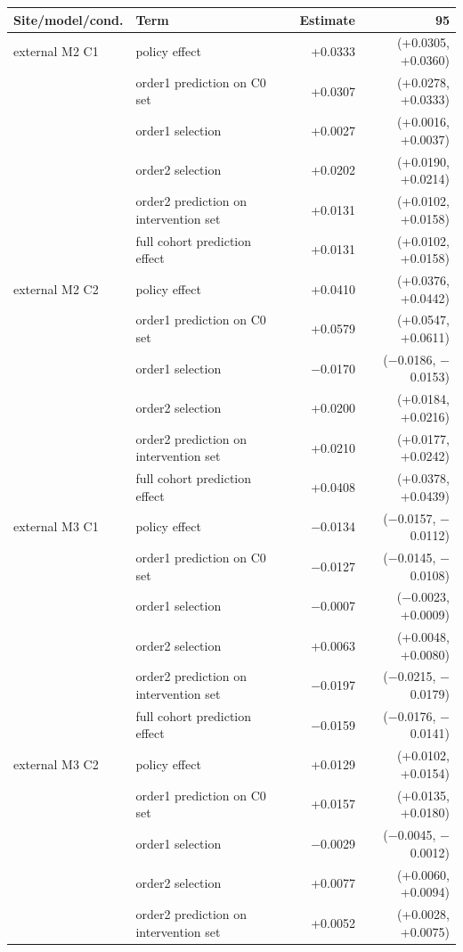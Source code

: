 \begin{longtable}{lllrr}
\toprule
Site/model/cond. & Term & & Estimate & 95\\%
\midrule
\endhead
external M2 C1 & policy effect & & +0.0333 & (+0.0305, +0.0360)\\
 & order1 prediction on C0 set & & +0.0307 & (+0.0278, +0.0333)\\
 & order1 selection & & +0.0027 & (+0.0016, +0.0037)\\
 & order2 selection & & +0.0202 & (+0.0190, +0.0214)\\
 & order2 prediction on intervention set & & +0.0131 & (+0.0102, +0.0158)\\
 & full cohort prediction effect & & +0.0131 & (+0.0102, +0.0158)\\
external M2 C2 & policy effect & & +0.0410 & (+0.0376, +0.0442)\\
 & order1 prediction on C0 set & & +0.0579 & (+0.0547, +0.0611)\\
 & order1 selection & & $-$0.0170 & ($-$0.0186, $-$0.0153)\\
 & order2 selection & & +0.0200 & (+0.0184, +0.0216)\\
 & order2 prediction on intervention set & & +0.0210 & (+0.0177, +0.0242)\\
 & full cohort prediction effect & & +0.0408 & (+0.0378, +0.0439)\\
external M3 C1 & policy effect & & $-$0.0134 & ($-$0.0157, $-$0.0112)\\
 & order1 prediction on C0 set & & $-$0.0127 & ($-$0.0145, $-$0.0108)\\
 & order1 selection & & $-$0.0007 & ($-$0.0023, +0.0009)\\
 & order2 selection & & +0.0063 & (+0.0048, +0.0080)\\
 & order2 prediction on intervention set & & $-$0.0197 & ($-$0.0215, $-$0.0179)\\
 & full cohort prediction effect & & $-$0.0159 & ($-$0.0176, $-$0.0141)\\
external M3 C2 & policy effect & & +0.0129 & (+0.0102, +0.0154)\\
 & order1 prediction on C0 set & & +0.0157 & (+0.0135, +0.0180)\\
 & order1 selection & & $-$0.0029 & ($-$0.0045, $-$0.0012)\\
 & order2 selection & & +0.0077 & (+0.0060, +0.0094)\\
 & order2 prediction on intervention set & & +0.0052 & (+0.0028, +0.0075)\\

\end{longtable}
